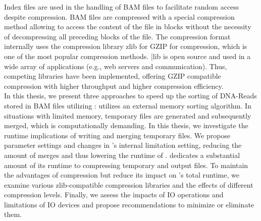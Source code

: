 Index files are used in the handling of BAM files to facilitate random access despite compression. BAM files are compressed with a special compression method allowing to access the content of the file in blocks without the necessity of decompressing all preceding blocks of the file. The compression format internally uses the compression library zlib for GZIP for compression, which is one of the most popular compression methods. |lib is open source and used in a wide array of applications (e.g., web servers and communication). Thus, competing libraries have been implemented, offering GZIP compatible compression with higher throughput and higher compression efficiency. \\

In this thesis, we present three approaches to speed up the sorting of DNA-Reads stored in BAM files utilizing \sort: 
\sort utilizes an external memory sorting algorithm. In situations with limited memory, temporary files are generated and subsequently merged, which is computationally demanding. In this thesis, we investigate the runtime implications of \sort writing and merging temporary files. We propose parameter settings and changes in \sort's internal limitation setting, reducing the amount of merges and thus lowering the runtime of \sort. 
\sort dedicates a substantial amount of its runtime to compressing temporary and output files. To maintain the advantages of compression but reduce its impact on \sort's total runtime, we examine various zlib-compatible compression libraries and the effects of different compression levels.
Finally, we assess the impacts of IO operations and limitations of IO devices and propose recommendations to minimize or eliminate them. 
